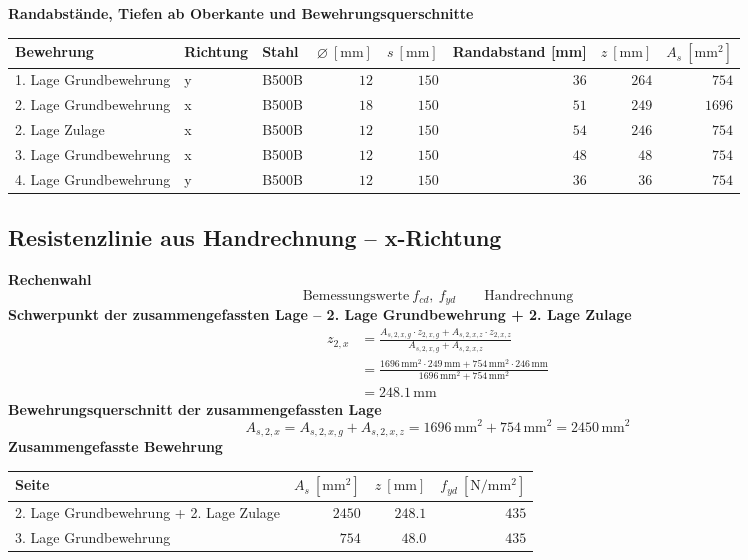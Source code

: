\documentclass[11pt,a4paper]{article}
\begin{document}
\noindent\textbf{Randabstände, Tiefen ab Oberkante und Bewehrungsquerschnitte}
\begin{longtable}{lllrrrrr}
\hline
Bewehrung & Richtung & Stahl & $\varnothing\ [\mathrm{mm}]$ & $s\ [\mathrm{mm}]$ & Randabstand [mm] & $z\ [\mathrm{mm}]$ & $A_s\ [\mathrm{mm}^2]$ \\
\hline
\endhead
1. Lage Grundbewehrung & y & B500B & $12$ & $150$ & $36$ & $264$ & $754$ \\
2. Lage Grundbewehrung & x & B500B & $18$ & $150$ & $51$ & $249$ & $1696$ \\
2. Lage Zulage & x & B500B & $12$ & $150$ & $54$ & $246$ & $754$ \\
3. Lage Grundbewehrung & x & B500B & $12$ & $150$ & $48$ & $48$ & $754$ \\
4. Lage Grundbewehrung & y & B500B & $12$ & $150$ & $36$ & $36$ & $754$ \\
\hline
\end{longtable}
\subsection{Resistenzlinie aus Handrechnung – x-Richtung}
\noindent\textbf{Rechenwahl}
\begin{equation*}
\text{Bemessungswerte}\ f_{cd},\ f_{yd} \qquad \text{Handrechnung}
\end{equation*}
\noindent\textbf{Schwerpunkt der zusammengefassten Lage – 2. Lage Grundbewehrung + 2. Lage Zulage}
\begin{equation*}
\begin{aligned}
  z_{2,x} &= \frac{A_{s,2,x,g} \cdot z_{2,x,g} + A_{s,2,x,z} \cdot z_{2,x,z}}{A_{s,2,x,g} + A_{s,2,x,z}} \\
  &= \frac{1696\,\mathrm{mm}^{2} \cdot 249\,\mathrm{mm} + 754\,\mathrm{mm}^{2} \cdot 246\,\mathrm{mm}}{1696\,\mathrm{mm}^{2} + 754\,\mathrm{mm}^{2}} \\
  &= 248.1\,\mathrm{mm}
\end{aligned}
\end{equation*}
\noindent\textbf{Bewehrungsquerschnitt der zusammengefassten Lage}
\begin{equation*}
A_{s,2,x} = A_{s,2,x,g} + A_{s,2,x,z} = 1696\,\mathrm{mm}^{2} + 754\,\mathrm{mm}^{2} = 2450\,\mathrm{mm}^{2}
\end{equation*}
\noindent\textbf{Zusammengefasste Bewehrung}
\begin{longtable}{lrrr}
\hline
Seite & $A_s\ [\mathrm{mm}^2]$ & $z\ [\mathrm{mm}]$ & $f_{yd}\ [\mathrm{N/mm^2}]$ \\
\hline
\endhead
2. Lage Grundbewehrung + 2. Lage Zulage & $2450$ & $248.1$ & $435$ \\
3. Lage Grundbewehrung & $754$ & $48.0$ & $435$ \\
\hline
\end{longtable}
\end{document}
